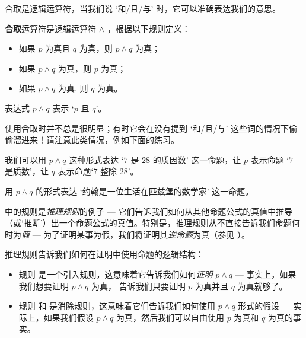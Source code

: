 合取是逻辑运算符，当我们说 `和/且/与' 时，它可以准确表达我们的意思。

\begin{idefinition}
\label{defConjunction}
\textbf{合取}运算符是逻辑运算符 $\wedge$ ，根据以下规则定义：
\begin{itemize}
\item \introrule{\wedge} 如果 $p$ 为真且 $q$ 为真，则 $p \wedge q$ 为真；
\item {} 如果 $p \wedge q$ 为真，则 $p$ 为真；
\item {} 如果 $p \wedge q$ 为真, 则 $q$ 为真。
\end{itemize}
表达式 $p \wedge q$ 表示 `$p$ 且 $q$'。
\end{idefinition}

使用合取时并不总是很明显；有时它会在没有提到 `和/且/与' 这些词的情况下偷偷溜进来！请注意此类情况，例如下面的练习。

\begin{example}
\label{exSevenDividesTwentyEightConjunction}
我们可以用 $p \wedge q$ 这种形式表达 `$7$ 是 $28$ 的质因数' 这一命题，让 $p$ 表示命题 `$7$ 是质数'，让 $q$ 表示命题`$7 $ 整除 $28$'。
\end{example}

\begin{exercise}
\label{exJohnMathematicianPittsburgh}
用 $p \wedge q$ 的形式表达 `约翰是一位生活在匹兹堡的数学家' 这一命题。
\end{exercise}
 中的规则是\textit{推理规则}的例子 --- 它们告诉我们如何从其他命题公式的真值中推导（或`推断'）出一个命题公式的真值。特别是，推理规则从不直接告诉我们命题何时为\textit{假} --- 为了证明某事为假，我们将证明其\textit{逆命题}为真（参见 ）。

推理规则告诉我们如何在证明中使用命题的逻辑结构：

\begin{itemize}
\item 规则 \introrule{\wedge} 是一个引入规则，这意味着它告诉我们如何\textit{证明} $p \wedge q$ --- 事实上，如果我们想要证明 $p \wedge q$ 为真，\introrule{\wedge} 告诉我们只要证明 $p$ 为真并且 $q$ 为真就够了。

\item 规则  和  是消除规则，这意味着它们告诉我们如何使用 $p \wedge q$ 形式的假设 --- 实际上，如果我们假设 $p \wedge q$ 为真，然后我们可以自由使用 $p$ 为真和 $q$ 为真的事实。
\end{itemize}

